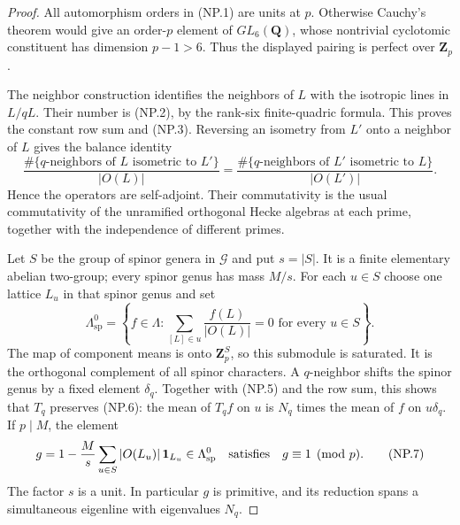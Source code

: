 \begin{proof}
All automorphism orders in (NP.1) are units at $p$.  Otherwise Cauchy's
theorem would give an order-$p$ element of $GL_6(\mathbf Q)$, whose
nontrivial cyclotomic constituent has dimension $p-1>6$.
Thus the displayed pairing is perfect over $\mathbf Z_p$.

The neighbor construction identifies the neighbors of $L$ with the
isotropic lines in $L/qL$.  Their number is (NP.2), by the rank-six
finite-quadric formula.  This proves the constant row sum and (NP.3).
Reversing an isometry from $L'$ onto a neighbor of $L$ gives the balance
identity
\[
 \frac{\#\{q\text{-neighbors of }L\text{ isometric to }L'\}}{|O(L)|}
 =\frac{\#\{q\text{-neighbors of }L'\text{ isometric to }L\}}{|O(L')|}.
 \tag{NP.5}
\]
Hence the operators are self-adjoint.  Their commutativity is the usual
commutativity of the unramified orthogonal Hecke algebras at each prime,
together with the independence of different primes.

Let $S$ be the group of spinor genera in $\mathcal G$ and put $s=|S|$.
It is a finite elementary abelian two-group; every spinor genus has
mass $M/s$.  For each $u\in S$ choose one lattice $L_u$ in that spinor
genus and set
\[
 \Lambda^0_{\mathrm{sp}}
  =\left\{f\in\Lambda:\sum_{[L]\in u}\frac{f(L)}{|O(L)|}=0
                       \text{ for every }u\in S\right\}.
 \tag{NP.6}
\]
The map of component means is onto $\mathbf Z_p^S$, so this submodule
is saturated.  It is the orthogonal complement of all spinor characters.
A $q$-neighbor shifts the spinor genus by a fixed element $\delta_q$.
Together with (NP.5) and the row sum, this shows that $T_q$ preserves
(NP.6): the mean of $T_qf$ on $u$ is $N_q$ times the mean of $f$ on
$u\delta_q$.  If $p\mid M$, the element
\[
 g=1-\frac Ms\sum_{u\in S}|O(L_u)|\,\mathbf1_{L_u}
       \in\Lambda^0_{\mathrm{sp}}
       \quad\hbox{satisfies}\quad g\equiv1\pmod p.
 \tag{NP.7}
\]
The factor $s$ is a unit.  In particular $g$ is primitive, and its
reduction spans a simultaneous eigenline with eigenvalues $N_q$.


\end{proof}
